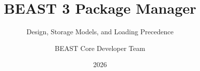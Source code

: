 \documentclass[aspectratio=169,11pt]{beamer}
\title{BEAST 3 Package Manager}
\subtitle{Design, Storage Models, and Loading Precedence}
\author{BEAST Core Developer Team}
\date{2026}
\begin{document}
\begin{frame}
\titlepage
\end{frame}


\end{document}
